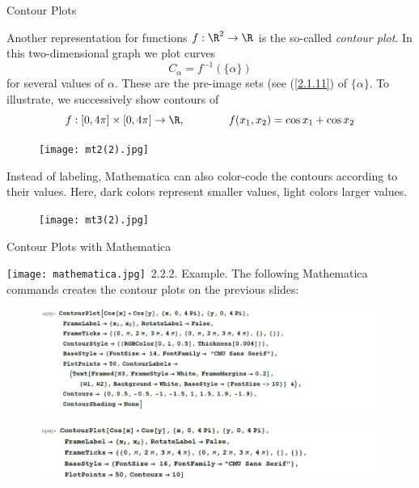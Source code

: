 \documentclass[smaller,hyperref={CJKbookmarks=true}]{beamer}
\begin{document}
\begin{frame}{Contour Plots}
\begin{spacing}{1}
Another representation for functions $f:\R^2\to\R$ is the so-called \emph{contour plot}. In this two-dimensional graph we plot curves
\[C_\alpha=f^{-1}(\{\alpha\})\]
for several values of $\alpha$. These are the pre-image sets (see (\eqref{2.1.11}) of $\{\alpha\}$.
\newpage
To illustrate, we successively show contours of
\[f:[0,4\pi]\times[0,4\pi]\to\R,\qquad\qquad f(x_1,x_2)=\cos x_1+\cos x_2\]
\begin{figure}
  \centering
  \texttt{[image: mt2(2).jpg]}

\end{figure}
\newpage
Instead of labeling, Mathematica can also color-code the contours
according to their values. Here, dark colors represent smaller values, light
colors larger values.
\begin{figure}
  \centering
  \texttt{[image: mt3(2).jpg]}

\end{figure}
\end{spacing}
\end{frame}
\begin{frame}[c]{Contour Plots with Mathematica}
\begin{spacing}{1.1}
\texttt{[image: mathematica.jpg]}~\alert{2.2.2. Example.} The following Mathematica commands creates the
contour plots on the previous slides:
\begin{figure}
  \centering
  \includegraphics[width=\textwidth]{43.jpg}

\end{figure}
\begin{figure}
  \centering
  \includegraphics[width=\textwidth]{44.jpg}

\end{figure}
\end{spacing}
\end{frame}
\end{document}
